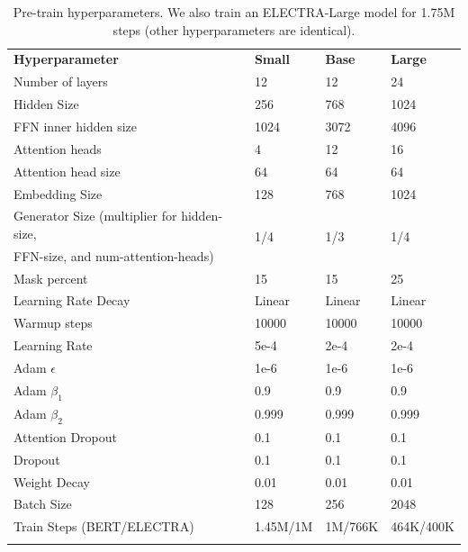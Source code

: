 \documentclass{article}
\newcommand\tstrut{\rule{0pt}{2.6ex}}
\newcommand\bstrut{\rule[-1.0ex]{0pt}{0pt}}
\newcommand{\thinline}{\Xhline{1.5\arrayrulewidth}}
\newcommand{\thickline}{\Xhline{2.5\arrayrulewidth}}
\newcommand{\tsep}	{\bstrut \\ \thinline}
\newcommand{\ttop}{\thickline}
\newcommand{\tbottom}{\bstrut \\ \thickline}
\begin{document}
\addtolength{\tabcolsep}{0pt}
\begin{table}[t!]
\begin{center}
\begin{tabularx}{0.9\linewidth}{X l l l}
\ttop
\textbf{Hyperparameter} & \textbf{Small} & \textbf{Base} & \textbf{Large} \tstrut \tsep
Number of layers & 12 & 12 & 24 \tstrut \\
Hidden Size & 256 & 768 & 1024 \\
FFN inner hidden size & 1024 & 3072 & 4096 \\
Attention heads & 4 & 12 & 16 \\
Attention head size & 64 & 64 & 64 \\
Embedding Size & 128 & 768 & 1024 \\
Generator Size (multiplier for hidden-size, & \multirow{2}{*}{1/4} & \multirow{2}{*}{1/3} & \multirow{2}{*}{1/4} \\
FFN-size, and num-attention-heads) & & & \\
Mask percent & 15 & 15 & 25 \\
Learning Rate Decay & Linear & Linear & Linear \\
Warmup steps & 10000 & 10000 & 10000 \\
Learning Rate & 5e-4 & 2e-4 & 2e-4 \\
Adam $\epsilon$ & 1e-6 & 1e-6 & 1e-6 \\
Adam $\beta_1$ & 0.9 & 0.9 & 0.9 \\
Adam $\beta_2$ & 0.999 & 0.999 & 0.999 \\
Attention Dropout & 0.1 & 0.1 & 0.1 \\
Dropout & 0.1 & 0.1 & 0.1 \\
Weight Decay & 0.01 & 0.01 & 0.01 \\
Batch Size & 128 & 256 & 2048 \\
Train Steps (BERT/ELECTRA) & 1.45M/1M & 1M/766K & 464K/400K \tbottom
\end{tabularx} 
\end{center}
\caption{Pre-train hyperparameters. We also train an ELECTRA-Large model for 1.75M steps (other hyperparameters are identical).}
\label{tab:hyperpre}
\end{table}
\addtolength{\tabcolsep}{0pt}
\end{document}
